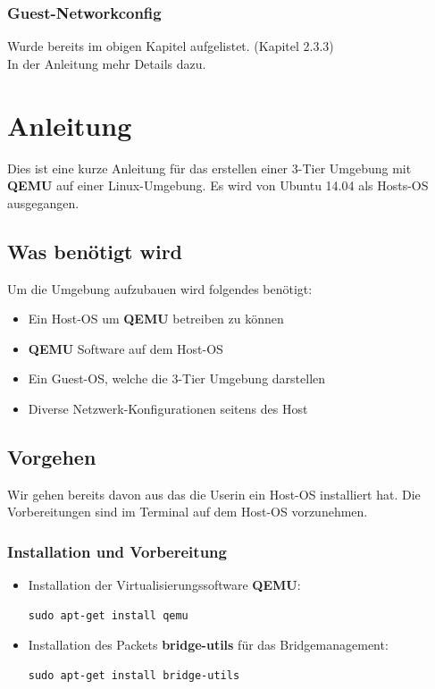 \documentclass[a4,12pt]{scrartcl}
\begin{document}
\subsubsection{Guest-Networkconfig}
Wurde bereits im obigen Kapitel aufgelistet. (Kapitel 2.3.3)\\
In der Anleitung mehr Details dazu. 

\section{Anleitung}
Dies ist eine kurze Anleitung für das erstellen einer 3-Tier Umgebung mit \textbf{QEMU} auf einer Linux-Umgebung. Es wird von Ubuntu 14.04 als Hosts-OS ausgegangen.

\subsection{Was benötigt wird}
Um die Umgebung aufzubauen wird folgendes benötigt: 
\begin{itemize}
\item Ein Host-OS um \textbf{QEMU} betreiben zu können
\item \textbf{QEMU} Software auf dem Host-OS 
\item Ein Guest-OS, welche die 3-Tier Umgebung darstellen 
\item Diverse Netzwerk-Konfigurationen seitens des Host 
\end{itemize}

\subsection{Vorgehen}
Wir gehen bereits davon aus das die Userin ein Host-OS installiert hat.
Die Vorbereitungen sind im Terminal auf dem Host-OS vorzunehmen. 

\subsubsection{Installation und Vorbereitung}
\begin{itemize}
\item Installation der Virtualisierungssoftware \textbf{QEMU}:
\begin{lstlisting} 
sudo apt-get install qemu
\end{lstlisting}
\item Installation des Packets \textbf{bridge-utils} für das Bridgemanagement:
\begin{lstlisting}
sudo apt-get install bridge-utils
\end{lstlisting}
\end{itemize} 
\end{document}

